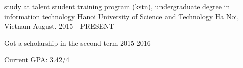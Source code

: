 


\begin{cventries}


\cventry
{study at talent student training program (kstn),
undergraduate degree in information technology} %
{Hanoi University of Science and Technology} %
{Ha Noi, Vietnam} %
{August. 2015 - PRESENT} %
{ %
\begin{cvitems}
\item {Got a scholarship in the second term 2015-2016}
\item {Current GPA: 3.42/4}
\end{cvitems}
}


\end{cventries}
